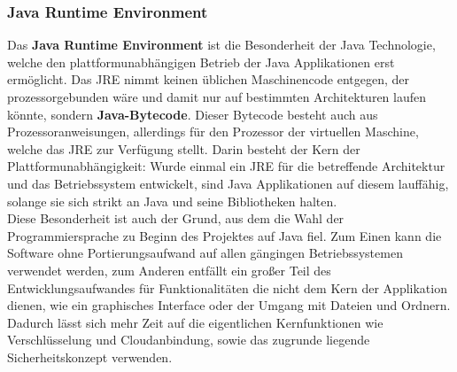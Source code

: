 \documentclass[13pt,a4paper,bibliography=totocnumbered,listof=totocnumbered]{scrartcl}
\begin{document}
\subsubsection{Java Runtime Environment}
Das \textbf{Java Runtime Environment} ist die Besonderheit der Java Technologie, welche den plattformunabhängigen Betrieb der Java Applikationen erst ermöglicht. Das  JRE nimmt keinen üblichen Maschinencode entgegen, der prozessorgebunden wäre und damit nur auf bestimmten Architekturen laufen könnte, sondern \textbf{Java-Bytecode}. Dieser Bytecode besteht auch aus Prozessoranweisungen, allerdings für den Prozessor der virtuellen Maschine, welche das JRE zur Verfügung stellt. Darin besteht der Kern der Plattformunabhängigkeit: Wurde einmal ein JRE für die betreffende Architektur und das Betriebssystem entwickelt, sind Java Applikationen auf diesem lauffähig, solange sie sich strikt an Java und seine Bibliotheken halten.\\
Diese Besonderheit ist auch der Grund, aus dem die Wahl der Programmiersprache zu Beginn des Projektes auf Java fiel. Zum Einen kann die Software ohne Portierungsaufwand auf allen gängingen Betriebssystemen verwendet werden, zum Anderen entfällt ein großer Teil des Entwicklungsaufwandes für Funktionalitäten die nicht dem Kern der Applikation dienen, wie ein graphisches Interface oder der Umgang mit Dateien und Ordnern. Dadurch lässt sich mehr Zeit auf die eigentlichen Kernfunktionen wie Verschlüsselung und Cloudanbindung,  sowie das zugrunde liegende Sicherheitskonzept verwenden. \\
\cite[S. 63f]{3}
\pagebreak
\end{document}

